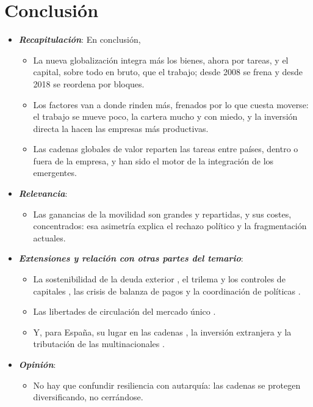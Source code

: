 \documentclass[11pt]{article}
\begin{document}
\section*{Conclusión}

\begin{itemize}
\item \textbf{\emph{Recapitulación}}: En conclusión,
  \begin{itemize}
  \item La nueva globalización integra más los bienes, ahora por tareas, y el capital, sobre todo en bruto, que el trabajo; desde 2008 se frena y desde 2018 se reordena por bloques.
  \item Los factores van a donde rinden más, frenados por lo que cuesta moverse: el trabajo se mueve poco, la cartera mucho y con miedo, y la inversión directa la hacen las empresas más productivas.
  \item Las cadenas globales de valor reparten las tareas entre países, dentro o fuera de la empresa, y han sido el motor de la integración de los emergentes.
  \end{itemize}
\item \textbf{\emph{Relevancia}}:
  \begin{itemize}
  \item Las ganancias de la movilidad son grandes y repartidas, y sus costes, concentrados: esa asimetría explica el rechazo político y la fragmentación actuales.
  \end{itemize}
\item \textbf{\emph{Extensiones y relación con otras partes del temario}}:
  \begin{itemize}
  \item La sostenibilidad de la deuda exterior , el trilema y los controles de capitales , las crisis de balanza de pagos  y la coordinación de políticas .
  \item Las libertades de circulación del mercado único .
  \item Y, para España, su lugar en las cadenas , la inversión extranjera  y la tributación de las multinacionales .
  \end{itemize}
\item \textbf{\emph{Opinión}}:
  \begin{itemize}
  \item No hay que confundir resiliencia con autarquía: las cadenas se protegen diversificando, no cerrándose.

\end{itemize}
\end{itemize}
\end{document}

